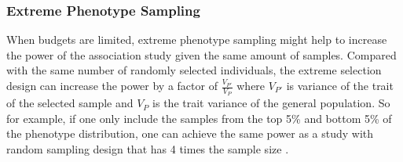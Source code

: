 \documentclass[12pt]{scrbook}
\begin{document}
\subsubsection{Extreme Phenotype Sampling}
When budgets are limited, extreme phenotype sampling might help to increase the power of the association study given the same amount of samples. 
Compared with the same number of randomly selected individuals, the extreme selection design can increase the power by a factor of $\frac{V_{P'}}{V_P}$ where $V_{P'}$ is variance of the trait of the selected sample and $V_P$ is the trait variance of the general population.
So for example, if one only include the samples from the top 5\% and bottom 5\% of the phenotype distribution, one can achieve the same power as a study with random sampling design that has 4 times the sample size \citep{Sham2014}. 
\end{document}
